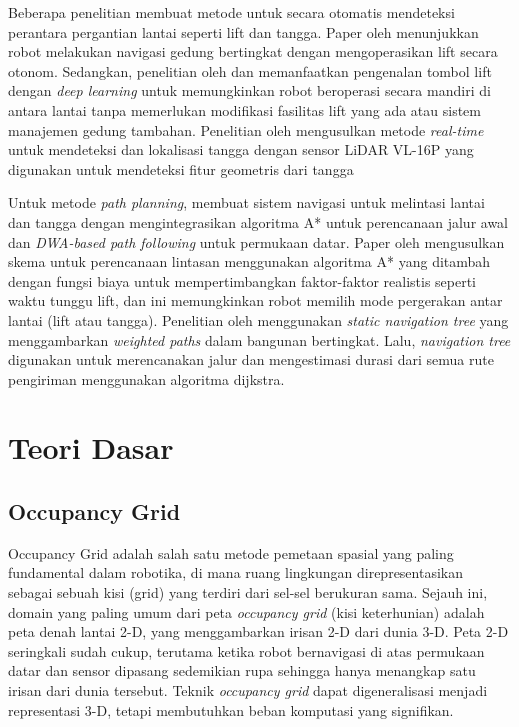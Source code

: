 Beberapa penelitian membuat metode untuk secara otomatis mendeteksi perantara pergantian lantai seperti lift dan tangga. 
Paper oleh \parencite{li2021autonomous} menunjukkan robot melakukan navigasi gedung bertingkat dengan mengoperasikan lift secara otonom. Sedangkan, penelitian oleh \parencite[]{lee2023autonomous} dan \parencite[]{kim2020mobile} memanfaatkan pengenalan tombol lift dengan \emph{deep learning} untuk memungkinkan robot beroperasi secara mandiri di antara lantai tanpa memerlukan modifikasi fasilitas lift yang ada atau sistem manajemen gedung tambahan. Penelitian oleh \parencite[]{zhu2020atv} mengusulkan metode \emph{real-time} untuk mendeteksi dan lokalisasi tangga dengan sensor LiDAR VL-16P yang digunakan untuk mendeteksi fitur geometris dari tangga 

Untuk metode \emph{path planning}, \parencite[]{xie2023autonomous} membuat sistem navigasi untuk melintasi lantai dan tangga dengan mengintegrasikan algoritma A* untuk perencanaan jalur awal dan \emph{DWA-based path following} untuk permukaan datar. Paper oleh \parencite[]{jung2024munes} mengusulkan skema untuk perencanaan lintasan menggunakan algoritma A* yang ditambah dengan fungsi biaya untuk mempertimbangkan faktor-faktor realistis seperti waktu tunggu lift, dan ini memungkinkan robot memilih mode pergerakan antar lantai (lift atau tangga). Penelitian oleh \parencite{palacin2023path} menggunakan \emph{static navigation tree} yang menggambarkan \emph{weighted paths} dalam bangunan bertingkat. Lalu, \emph{navigation tree} digunakan untuk merencanakan jalur dan mengestimasi durasi dari semua rute pengiriman menggunakan algoritma dijkstra. 

\section{Teori Dasar}
\label{sec:konsep dasar}

\subsection{Occupancy Grid}

Occupancy Grid adalah salah satu metode pemetaan spasial yang paling fundamental dalam robotika, di mana ruang lingkungan direpresentasikan sebagai sebuah kisi (grid) yang terdiri dari sel-sel berukuran sama. Sejauh ini, domain yang paling umum dari peta \textit{occupancy grid} (kisi keterhunian) adalah peta denah lantai 2-D, yang menggambarkan irisan 2-D dari dunia 3-D. Peta 2-D seringkali sudah cukup, terutama ketika robot bernavigasi di atas permukaan datar dan sensor dipasang sedemikian rupa sehingga hanya menangkap satu irisan dari dunia tersebut. Teknik \textit{occupancy grid} dapat digeneralisasi menjadi representasi 3-D, tetapi membutuhkan beban komputasi yang signifikan.

